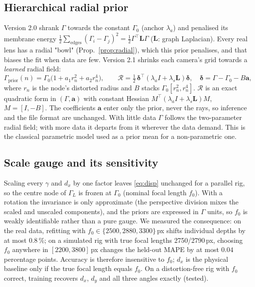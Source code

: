 \documentclass[11pt,a4paper]{article}
\newcommand{\G}{\Gamma}
\begin{document}
\subsection{Hierarchical radial prior}\label{sec:radial}
Version 2.0 shrank $\G$ towards the constant $\G_0$ (anchor $\lambda_a$) and penalised its membrane energy
$\tfrac12\sum_{\text{edges}}(\G_i-\G_j)^2=\tfrac12\G^\top\mathbf L\G$ ($\mathbf L$: graph Laplacian). Every real lens has a
radial "bowl" (Prop.~\ref{prop:radial}), which this prior penalises, and that biases the fit when data are few.
Version 2.1 shrinks each camera's grid towards a \emph{learned} radial field:
\begin{equation}
\G_\text{prior}(n)=\G_0\big(1+a_1r_n^2+a_2r_n^4\big),\qquad
\mathcal R=\tfrac12\,\bm\delta^\top(\lambda_a I+\lambda_s\mathbf L)\bm\delta,\quad \bm\delta=\G-\G_0-B\mathbf a,
\end{equation}
where $r_n$ is the node's distorted radius and $B$ stacks $\G_0[r_n^2,r_n^4]$. $\mathcal R$ is an exact
quadratic form in $(\G,\mathbf a)$ with constant Hessian $M^\top(\lambda_aI+\lambda_s\mathbf L)M$, $M=[I,-B]$. The
coefficients $\mathbf a$ enter only the prior, never the rays, so inference and the file format are unchanged.
With little data $\G$ follows the two-parameter radial field; with more data it departs from it wherever the
data demand. This is the classical parametric model used as a prior mean for a non-parametric one.

\subsection{Scale gauge and its sensitivity}
Scaling every $\gamma$ and $d_x$ by one factor leaves \eqref{eq:disp} unchanged for a parallel rig, so the centre
node of $\G_L$ is frozen at $\G_0$ (nominal focal length $f_0$). With a rotation the invariance is only approximate
(the perspective division mixes the scaled and unscaled components), and the priors are expressed in $\G$ units,
so $f_0$ is weakly identifiable rather than a pure gauge. We measured the consequence: on the real data,
refitting with $f_0\in\{2500,2880,3300\}$\,px shifts individual depths by at most $0.8\,\%$; on a simulated rig
with true focal lengths 2750/2790\,px, choosing $f_0$ anywhere in $[2200,3800]$\,px changes the held-out MAPE by at
most $0.04$ percentage points. Accuracy is therefore insensitive to $f_0$; $d_x$ is the physical baseline only if
the true focal length equals $f_0$. On a distortion-free rig with $f_0$ correct, training recovers $d_x$, $d_y$ and
all three angles exactly (tested).
\end{document}

